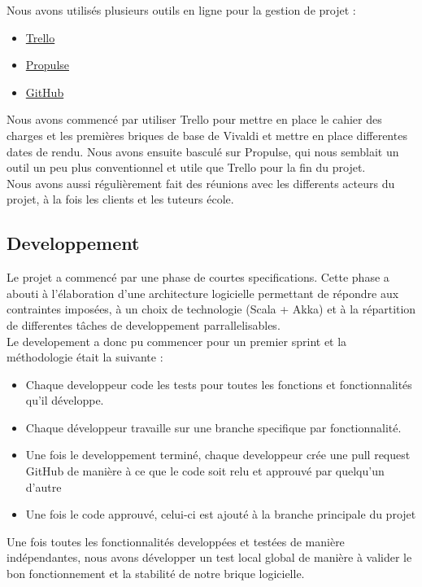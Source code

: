 \documentclass[11pt,a4paper]{article}
\begin{document}
Nous avons utilisés plusieurs outils en ligne pour la gestion de projet :
\begin{itemize}
\item \href{https://www.trello.com}{Trello}
\item \href{http://ppulse.f}{Propulse}
\item \href{http://www.github.com}{GitHub}
\end{itemize}

Nous avons commencé par utiliser Trello pour mettre en place le cahier des charges et les premières briques de base de Vivaldi et mettre en place differentes dates de rendu. Nous avons ensuite basculé sur Propulse, qui nous semblait un outil un peu plus conventionnel et utile que Trello pour la fin du projet.\\

Nous avons aussi régulièrement fait des réunions avec les differents acteurs du projet, à la fois les clients et les tuteurs école.

\subsection{Developpement}
\label{subsec:dev}
Le projet a commencé par une phase de courtes specifications. Cette phase a abouti à l'élaboration d'une architecture logicielle permettant de répondre aux contraintes imposées, à un choix de technologie (Scala + Akka) et à la répartition de differentes tâches de developpement parrallelisables. \\

Le developement a donc pu commencer pour un premier sprint et la méthodologie était la suivante :

\begin{itemize}
\item Chaque developpeur code les tests pour toutes les fonctions et fonctionnalités qu'il développe.
\item Chaque développeur travaille sur une branche specifique par fonctionnalité.
\item Une fois le developpement terminé, chaque developpeur crée une pull request GitHub de manière à ce que le code soit relu et approuvé par quelqu'un d'autre
\item Une fois le code approuvé, celui-ci est ajouté à la branche principale du projet
\end{itemize}

Une fois toutes les fonctionnalités developpées et testées de manière indépendantes, nous avons développer un test local global de manière à valider le bon fonctionnement et la stabilité de notre brique logicielle.\\
\end{document}
